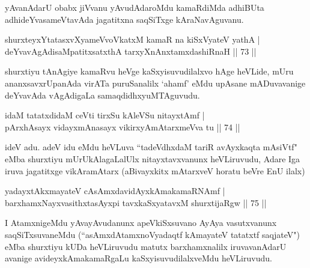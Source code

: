 \begin{artha}
yAvanAdarU obabx jiVvanu yAvudAdaroMdu kamaRdiMda adhiBUta adhideYvasameVtavAda jagatitxna saqSiTxge kAraNavAguvanu.
\end{artha}

\begin{shl}
shurxteyxYtatasxvXyameVvoVkatxM kamaR na kiSxVyateV yathA |\\
\footnotemark{}deYvavAgAdisaMpatitxsatxthA tarxyXnAnxtamxdashiRnaH \hfill || 73 ||
\end{shl}

\begin{artha}
shurxtiyu tAnAgiye kamaRvu heVge kaSxyisuvudilalxvo hAge heVLide, mUru ananxsavxrUpanAda virATa puruSanalilx `ahamf' eMdu upAsane mADuvavanige deYvavAda vAgAdigaLa samaqdidhxyuMTAguvudu.
\end{artha}


\begin{shl}
idaM tatatxdidaM ceVti tirxSu kAleVSu nitayxtAmf |\\
pArxhAsayx vidayxmAnasayx vikirxyAmAtarxmeVva tu \hfill || 74 ||
\end{shl}

\begin{artha}
ideV adu. adeV idu eMdu heVLuva ``tadeVdhxdaM tariR avAyxkaqta mAsiVtf" eMba shurxtiyu mUrUkAlagaLalUlx nitayxtavxvanunx heVLiruvudu, Adare Iga iruva jagatitxge vikAramAtarx (aBivayxkitx mAtarxveV horatu beVre EnU ilalx)
\end{artha}

\begin{shl}
yadayxtAkxmayateV cAsAmxdavidAyxkAmakamaRNAmf |\\
barxhamxNayxvasithxtasAyxpi tavxkaSxyatavxM shurxtijaRgw \hfill || 75 ||
\end{shl}

\begin{artha}
I AtamxnigeMdu yAvayAvudanunx apeVkiSxsuvano AyAya vasutxvanunx saqSiTxsuvaneMdu (``asAmxdAtamxnoVyadaqtf kAmayateV tatatxtf saqjateV") eMba shurxtiyu kUDa heVLiruvudu matutx barxhamxnalilx iruvavanAdarU avanige avideyxkAmakamaRgaLu kaSxyisuvudilalxveMdu heVLiruvudu.
\end{artha}

